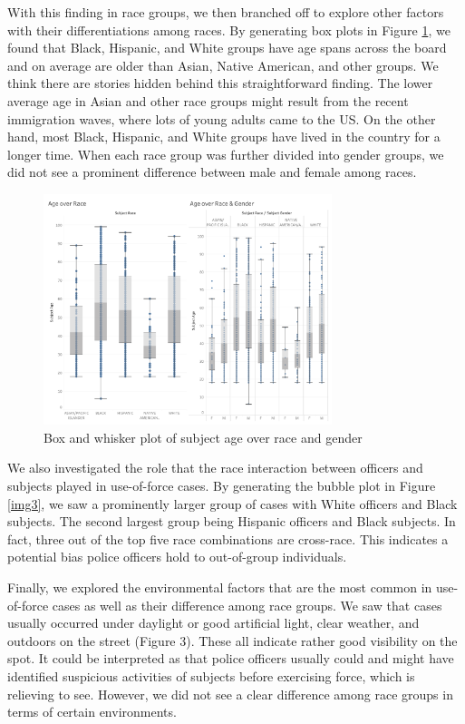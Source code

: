 \documentclass[10pt]{article}
\begin{document}
With this finding in race groups, we then branched off to explore other factors with their differentiations among races. By generating box plots in Figure \ref{img2}, we found that Black, Hispanic, and White groups have age spans across the board and on average are older than Asian, Native American, and other groups. We think there are stories hidden behind this straightforward finding. The lower average age in Asian and other race groups might result from the recent immigration waves, where lots of young adults came to the US. On the other hand, most Black, Hispanic, and White groups have lived in the country for a longer time. When each race group was further divided into gender groups, we did not see a prominent difference between male and female among races.

\begin{figure}[H]
\centering
\includegraphics[width=0.75\textwidth]{img2}
\caption{Box and whisker plot of subject age over race and gender}
\label{img2}
\end{figure}

We also investigated the role that the race interaction between officers and subjects played in use-of-force cases. By generating the bubble plot in Figure \ref{img3}, we saw a prominently larger group of cases with White officers and Black subjects. The second largest group being Hispanic officers and Black subjects. In fact, three out of the top five race combinations are cross-race. This indicates a potential bias police officers hold to out-of-group individuals.

Finally, we explored the environmental factors that are the most common in use-of-force cases as well as their difference among race groups. We saw that cases usually occurred under daylight or good artificial light, clear weather, and outdoors on the street (Figure 3). These all indicate rather good visibility on the spot. It could be interpreted as that police officers usually could and might have identified suspicious activities of subjects before exercising force, which is relieving to see. However, we did not see a clear difference among race groups in terms of certain environments.
\end{document}
